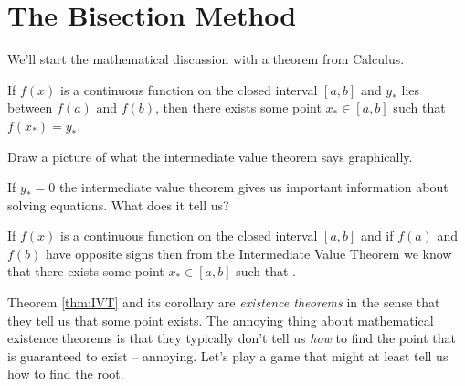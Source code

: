 \newpage
\section{The Bisection Method}
We'll start the mathematical discussion with a theorem from Calculus.
\begin{thm}
    If $f(x)$ is a continuous function on the closed interval $[a,b]$ and $y_*$ lies between
    $f(a)$ and $f(b)$, then there exists some point $x_* \in [a,b]$ such that $f(x_*) = y_*$.
    \label{thm:IVT}
\end{thm}


\begin{problem}
    Draw a picture of what the intermediate value theorem says graphically.
\end{problem}

\begin{problem}
    If $y_*=0$ the intermediate value theorem gives us important information about solving
    equations.  What does it tell us?
\end{problem}

\begin{cor}
    If $f(x)$ is a continuous function on the closed interval $[a,b]$ and if $f(a)$ and $f(b)$ have opposite
    signs then from the Intermediate Value Theorem we know that there exists some point
    $x_* \in [a,b]$ such that \underline{\hspace{1in}}.
\end{cor}

Theorem \ref{thm:IVT} and its corollary are {\it existence theorems} in the sense that
they tell us that some point exists.  The annoying thing about mathematical existence
theorems is that they typically don't tell us {\it how} to find the point that is guaranteed to
exist -- annoying.  Let's play a game that might at least tell us how to find the root.


